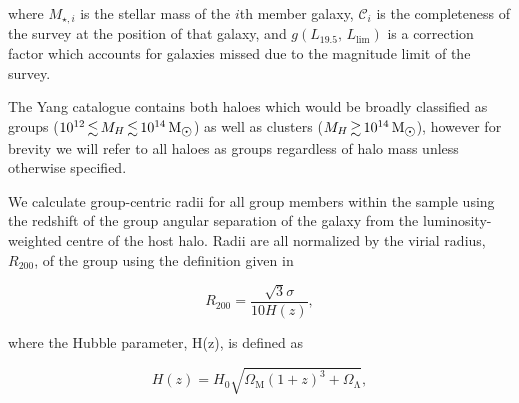 \documentclass[a4paper,fleqn,usenatbib]{mnras}
\newcommand{\Msun}{\,\mathrm{M_{\sun}}}
\begin{document}
\noindent
where $M_{\star,i}$ is the stellar mass of the $i$th member galaxy,
$\mathcal{C}_i$ is the completeness of the survey at the position of
that galaxy, and $g(L_{19.5},\,L_{\text{lim}})$ is a correction factor
which accounts for galaxies missed due to the magnitude limit of the
survey.
\par
The Yang catalogue contains both haloes which would be broadly classified as
groups ($10^{12} \la M_H \la 10^{14}\Msun$) as well as clusters ($M_H
\ga 10^{14}\Msun$), however for brevity we will refer to all haloes as
groups regardless of halo mass unless otherwise specified.
\par
We calculate group-centric radii for all group members within the
sample using the redshift of the group angular separation of the galaxy from the
luminosity-weighted centre of the host halo.  Radii are
all normalized by the virial radius, $R_{200}$, of the group using the
definition given in \citet{carlberg1997}

\begin{equation}
  R_{200} = \frac{\sqrt{3} \sigma}{10 H(z)},
\end{equation}

\noindent
where the Hubble parameter, H(z), is defined as

\begin{equation}
  H(z) = H_0 \sqrt{\Omega_\mathrm{M} (1+z)^3 +
    \Omega_\mathrm{\Lambda}},
\end{equation}
\end{document}
